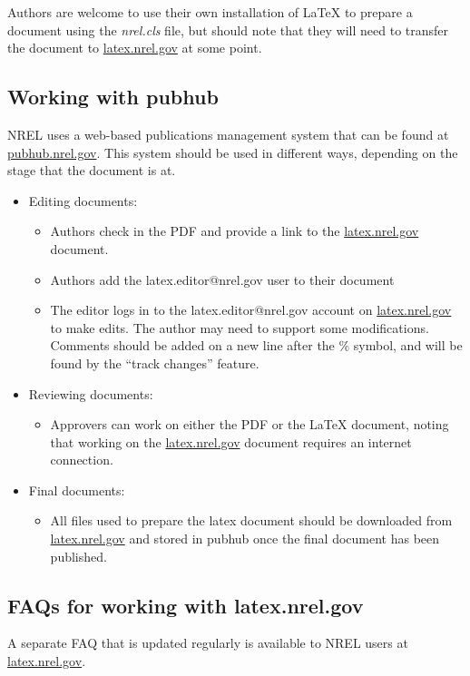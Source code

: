 Authors are welcome to use their own installation of LaTeX to prepare a document using the \emph{nrel.cls} file, but should note that they will need to transfer the document to \href{latex.nrel.gov}{latex.nrel.gov} at some point.

\subsection{Working with pubhub}
NREL uses a web-based publications management system that can be found at \href{pubhub.nrel.gov}{pubhub.nrel.gov}. This system should be used in different ways, depending on the stage that the document is at.
\begin{itemize}
\item Editing documents: 
\begin{itemize} 
\item Authors check in the PDF and provide a link to the \href{latex.nrel.gov}{latex.nrel.gov} document.
\item Authors add the latex.editor@nrel.gov user to their document
\item The editor logs in to the latex.editor@nrel.gov account on \href{latex.nrel.gov}{latex.nrel.gov} to make edits. The author may need to support some modifications. Comments should be added on a new line after the \% symbol, and will be found by the ``track changes'' feature.
\end{itemize}
\item Reviewing documents:
\begin{itemize} 
\item Approvers can work on either the PDF or the LaTeX document, noting that working on the \href{latex.nrel.gov}{latex.nrel.gov} document requires an internet connection.
\end{itemize}
\item Final documents: 
\begin{itemize} 
\item All files used to prepare the latex document should be downloaded from \href{latex.nrel.gov}{latex.nrel.gov} and stored in pubhub once the final document has been published.
\end{itemize}
\end{itemize}

\subsection{FAQs for working with latex.nrel.gov}
A separate FAQ that is updated regularly is available to NREL users at \href{latex.nrel.gov}{latex.nrel.gov}.


